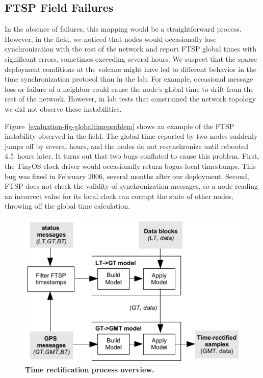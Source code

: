 \subsection{FTSP Field Failures}
\label{evaluation-timing-deploymentfailures}

In the absence of failures, this mapping would be a straightforward process.
However, in the field, we noticed that nodes would occasionally lose
synchronization with the rest of the network and report FTSP global times
with significant errors, sometimes exceeding several hours. We suspect that
the sparse deployment conditions at the volcano might have led to different
behavior in the time synchronization protocol than in the lab. For example,
occasional message loss or failure of a neighbor could cause the node's
global time to drift from the rest of the network. However, in lab tests that
constrained the network topology we did not observe these instabilities.

Figure~\ref{evaluation-fig-globaltimeproblem} shows an example of the FTSP
instability observed in the field. The global time reported by two nodes
suddenly jumps off by several hours, and the nodes do not resynchronize until
rebooted 4.5~hours later. It turns out that two bugs conflated to cause this
problem. First, the TinyOS clock driver would occasionally return bogus local
timestamps. This bug was fixed in February 2006, several months after our
deployment. Second, FTSP does not check the validity of synchronization
messages, so a node reading an incorrect value for its local clock can
corrupt the state of other nodes, throwing off the global time calculation.

\begin{figure}[t]
\begin{center}
\includegraphics[width=0.8\hsize]{./3-evaluation/figs/rectificationcartoon.pdf}
\end{center}

\caption{\textbf{Time rectification process overview.}}

\label{evaluation-fig-rectificationcartoon}
\end{figure}

